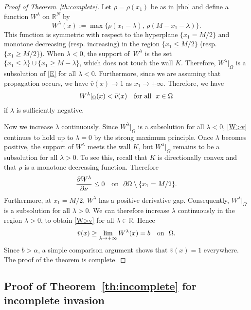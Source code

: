 \documentclass[a4paper,12pt,fullpage]{article}
\numberwithin{equation}{section}
\def\R{{\mathbb R}}
\begin{document}
\begin{proof}[Proof of Theorem~\ref{th:complete}] 
Let $\rho=\rho(x_1)$ be as in \eqref{rho} and define a function $W^\lambda$ on $\R^N$ by
\begin{equation}\label{rho-lambda}
W^\lambda(x):=\max\{ \rho(x_1-\lambda), \, \rho(M-x_1-\lambda)\}.
\end{equation}
This function is symmetric with respect to the hyperplane $\{x_1=M/2\}$ and monotone decreasing (resp. increasing) in the region $\{x_1\leq M/2\}$ (resp. $\{x_1\geq M/2\}$). When $\lambda<0$, the support of~$W^\lambda$ is the set $\{x_1\leq\lambda\}\cup\{x_1\geq M-\lambda\}$, which does not touch the wall $K$. Therefore, $W^\lambda|_\Omega$ is a subsolution of \eqref{E} for all $\lambda<0$. Furthermore, since we are assuming that propagation occurs, we have $\bar{v}(x)\to 1$ as $x_1\to\pm\infty$. Therefore, we have
\begin{equation}\label{W>v}
W^\lambda|_\Omega(x)<\bar{v}(x)\quad \hbox{for all} \ \ x\in\Omega
\end{equation}
if $\lambda$ is sufficiently negative.

Now we increase $\lambda$ continuously. Since $W^\lambda|_\Omega$ is a subsolution for all $\lambda<0$, \eqref{W>v} continues to hold up to $\lambda=0$ by the strong maximum principle. 
Once $\lambda$ becomes positive, the support of $W^\lambda$ meets the wall $K$, but $W^\lambda|_\Omega$ remains to be a subsolution for all $\lambda> 0$. To see this, recall that $K$ is directionally convex and that $\rho$ is a monotone decreasing function. Therefore
\[
\frac{\partial W^\lambda}{\partial\nu}\leq 0 \quad \hbox{on}\ \ \partial\Omega\setminus\{x_1=M/2\}.
\]
Furthermore, at $x_1=M/2$,  $W^\lambda$ has a positive derivative gap. Consequently, $W^\lambda|_\Omega$ is a subsolution for all $\lambda>0$. We can therefore increase $\lambda$ continuously in the region $\lambda>0$, to obtain \eqref{W>v} for all $\lambda\in\R$. Hence
\[
\bar{v}(x) \geq \lim_{\lambda\to+\infty}W^\lambda(x)=b\quad \hbox{on}\ \ \Omega.
\]
Since $b>\alpha$, a simple comparison argument shows that $\bar{v}(x)=1$ everywhere. The proof of the theorem is complete.
\end{proof}


\subsection{Proof of Theorem~\ref{th:incomplete} for incomplete invasion}
\end{document}
